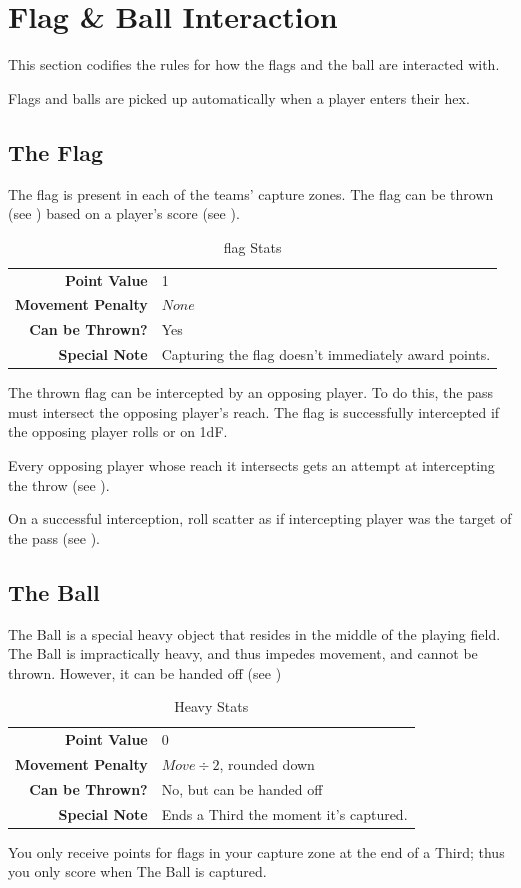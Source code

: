 \section{Flag \& Ball Interaction} \label{flag-interaction}
This section codifies the rules for how the flags and the ball are interacted with.

Flags and balls are picked up automatically when a player enters their hex.

\subsection{The Flag}
The flag is present in each of the teams' capture zones.
The flag can be thrown (see ) based on a player's \throw{} score (see ).

\begin{table}[!ht]
    \centering
\begin{tabular}{r|l}
    \textbf{Point Value} & 1 \\
    \textbf{Movement Penalty} & $None$ \\
    \textbf{Can be Thrown?} & Yes \\
    \textbf{Special Note} & Capturing the flag doesn't immediately award points. \\
\end{tabular} 
    \caption{flag Stats}
    \label{tab:flag}
\end{table}
The thrown flag can be intercepted by an opposing player.
To do this, the pass must intersect the opposing player's reach.
The flag is successfully intercepted if the opposing player rolls \blank{} or \plus{} on 1dF.

Every opposing player whose reach it intersects gets an attempt at intercepting the throw (see ).

On a successful interception, roll scatter as if intercepting player was the target of the pass (see ).

\subsection{The Ball}
The Ball is a special heavy object that resides in the middle of the playing field.
The Ball is impractically heavy, and thus impedes movement, and cannot be thrown.
However, it can be handed off (see )

\begin{table}[!ht]
    \centering
\begin{tabular}{r|l}
    \textbf{Point Value} & $0$ \\
    \textbf{Movement Penalty} & $Move\div 2$, rounded down \\
    \textbf{Can be Thrown?} & No, but can be handed off \\
    \textbf{Special Note} & Ends a Third the moment it’s captured.\\
\end{tabular}
    \caption{Heavy Stats}
    \label{tab:heavy}
\end{table}
You only receive points for flags in your capture zone at the end of a Third; thus you only score when The Ball is captured.

